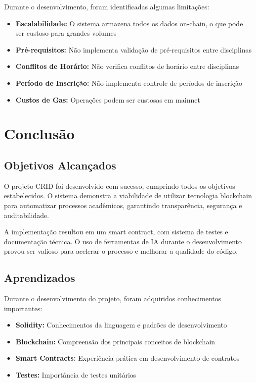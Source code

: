 \documentclass[12pt,a4paper]{article}
\begin{document}
Durante o desenvolvimento, foram identificadas algumas limitações:

\begin{itemize}
    \item \textbf{Escalabilidade:} O sistema armazena todos os dados on-chain, o que pode ser custoso para grandes volumes
    \item \textbf{Pré-requisitos:} Não implementa validação de pré-requisitos entre disciplinas
    \item \textbf{Conflitos de Horário:} Não verifica conflitos de horário entre disciplinas
    \item \textbf{Período de Inscrição:} Não implementa controle de períodos de inscrição
    \item \textbf{Custos de Gas:} Operações podem ser custosas em mainnet
\end{itemize}

\section{Conclusão}

\subsection{Objetivos Alcançados}

O projeto CRID foi desenvolvido com sucesso, cumprindo todos os objetivos estabelecidos. O sistema demonstra a viabilidade de utilizar tecnologia blockchain para automatizar processos acadêmicos, garantindo transparência, segurança e auditabilidade.

A implementação resultou em um smart contract, com sistema de testes e documentação técnica. O uso de ferramentas de IA durante o desenvolvimento provou ser valioso para acelerar o processo e melhorar a qualidade do código.

\subsection{Aprendizados}

Durante o desenvolvimento do projeto, foram adquiridos conhecimentos importantes:

\begin{itemize}
    \item \textbf{Solidity:} Conhecimentos da linguagem e padrões de desenvolvimento
    \item \textbf{Blockchain:} Compreensão dos principais conceitos de blockchain
    \item \textbf{Smart Contracts:} Experiência prática em desenvolvimento de contratos
    \item \textbf{Testes:} Importância de testes unitários
\end{itemize}
\end{document}
